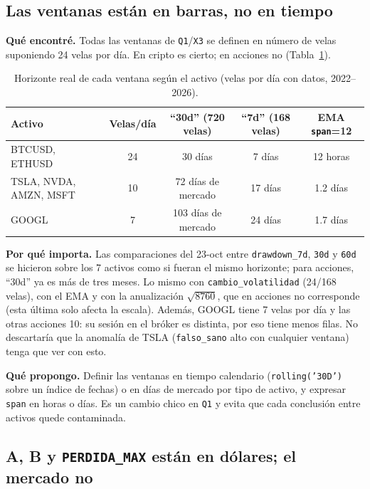 \documentclass[11pt,a4paper]{article}
\newcommand{\code}[1]{\texttt{\small #1}}
\begin{document}
\subsection{Las ventanas están en barras, no en tiempo}\label{sec:ventanas}

\textbf{Qué encontré.} Todas las ventanas de \code{Q1}/\code{X3} se definen en número de velas
suponiendo 24 velas por día. En cripto es cierto; en acciones no (Tabla~\ref{tab:ventanas}).

\begin{table}[h]
\centering\small
\begin{tabular}{lcccc}
\toprule
Activo & Velas/día & ``30d'' (720 velas) & ``7d'' (168 velas) & EMA \code{span}=12 \\
\midrule
BTCUSD, ETHUSD & 24 & 30 días & 7 días & 12 horas \\
TSLA, NVDA, AMZN, MSFT & 10 & 72 días de mercado & 17 días & 1.2 días \\
GOOGL & 7 & 103 días de mercado & 24 días & 1.7 días \\
\bottomrule
\end{tabular}
\caption{Horizonte real de cada ventana según el activo (velas por día con datos, 2022--2026).}
\label{tab:ventanas}
\end{table}

\textbf{Por qué importa.} Las comparaciones del 23-oct entre \code{drawdown\_7d}, \code{30d} y \code{60d}
se hicieron sobre los 7 activos como si fueran el mismo horizonte; para acciones, ``30d'' ya es más de
tres meses. Lo mismo con \code{cambio\_volatilidad} (24/168 velas), con el EMA y con la anualización
$\sqrt{8760}$, que en acciones no corresponde (esta última solo afecta la escala). Además, GOOGL tiene
7 velas por día y las otras acciones 10: su sesión en el bróker es distinta, por eso tiene menos filas.
No descartaría que la anomalía de TSLA (\code{falso\_sano} alto con cualquier ventana) tenga que ver con
esto.

\textbf{Qué propongo.} Definir las ventanas en tiempo calendario (\code{rolling('30D')} sobre un índice de
fechas) o en días de mercado por tipo de activo, y expresar \code{span} en horas o días. Es un cambio
chico en \code{Q1} y evita que cada conclusión entre activos quede contaminada.

\subsection{\texorpdfstring{A, B y \code{PERDIDA\_MAX}}{A, B y PERDIDA_MAX} están en dólares; el mercado no}\label{sec:unidades}
\end{document}
